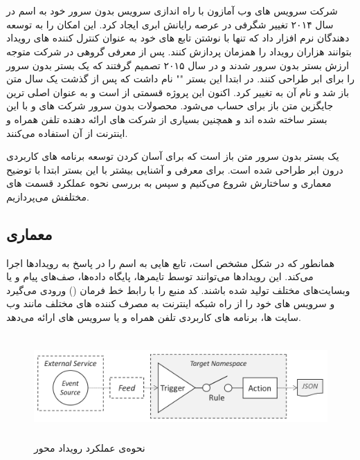 \newpage

\section{}

شرکت سرویس های وب آمازون با راه اندازی سرویس بدون سرور خود به اسم  در سال ۲۰۱۴ تغییر شگرفی در عرصه رایانش ابری ایجاد کرد.  این امکان را به توسعه دهندگان نرم افزار داد که تنها با نوشتن تابع های خود به عنوان کنترل کننده های رویداد بتوانند هزاران رویداد را همزمان پردازش کنند. پس از معرفی  گروهی در شرکت  متوجه ارزش بستر بدون سرور شدند و در سال ۲۰۱۵ تصمیم گرفتند که یک بستر بدون سرور را برای ابر  طراحی کنند. در ابتدا این بستر "" نام داشت که پس از گذشت یک سال متن باز شد و نام آن به  تغییر کرد. اکنون این پروژه قسمتی از  است و به عنوان اصلی ترین جایگزین متن باز برای  حساب می‌شود. محصولات بدون سرور شرکت های  و  با این بستر ساخته شده اند و همچنین بسیاری از شرکت های ارائه دهنده تلفن همراه و اینترنت از آن استفاده می‌کنند.

 یک بستر بدون سرور متن باز است که برای آسان کردن توسعه برنامه های کاربردی درون ابر طراحی شده است. برای معرفی و آشنایی بیشتر با این بستر ابتدا با توضیح معماری و ساختارش شروع می‌کنیم و سپس به بررسی نحوه عملکرد قسمت های مختلفش می‌پردازیم.

\subsection{معماری }

همانطور که در شکل مشخص است،  تابع هایی به اسم  را در پاسخ به رویدادها اجرا می‌کند. این رویدادها می‌توانند توسط تایمرها، پایگاه داده‌ها، صف‌های پیام و یا وبسایت‌های مختلف تولید شده باشند.  کد منبع را با رابط خط فرمان () ورودی می‌گیرد و سرویس های خود را از راه  شبکه اینترنت به مصرف کننده های مختلف مانند وب سایت ها، برنامه های کاربردی تلفن همراه و یا سرویس های  ارائه می‌دهد. 
\begin{figure}[!h]
	\centering
	\includegraphics[height=4cm]{images/OW-event-action}
	\caption{نحوه‌ی عملکرد رویداد محور }
	\label{تصویر 2-1}
\end{figure}

